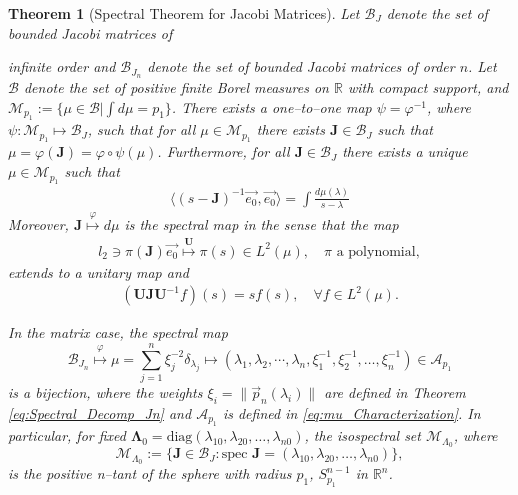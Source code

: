 \documentclass[english,12pt]{ttuthes}
\newtheorem{theorem}{Theorem}[chapter]
\begin{document}
\begin{theorem}[Spectral Theorem for Jacobi Matrices]
  \label{thm:Spectral_Theorem_J}
  Let $\mathcal{B}_J$ denote the set of bounded Jacobi matrices of

  infinite order and $\mathcal{B}_{J_n}$ denote the set of bounded Jacobi
  matrices of order $n$. Let $\mathscr{B}$ denote the set of positive
  finite Borel measures on $\mathbb{R}$ with compact support, and
  $\mathcal{M}_{p_1}:=\{\mu\in\mathscr{B}|\int d\mu=p_1\}$. There exists a one--to--one map
  $\psi=\varphi^{-1}$, where $\psi:\mathcal{M}_{p_1}\mapsto\mathcal{B}_J$, such that for all
  $\mu\in\mathcal{M}_{p_1}$ there exists $\mathbf{J}\in\mathcal{B}_J$ such that
  $\mu=\varphi(\mathbf{J})=\varphi\circ\psi(\mu)$. Furthermore, for all
  $\mathbf{J}\in\mathcal{B}_J$ there exists a unique $\mu\in\mathcal{M}_{p_1}$ 
  such that 
  \begin{align}
    \langle(s-\mathbf{J})^{-1}\vec{e_0},\vec{e_0}\rangle=\int\frac{d\mu(\lambda)}{s-\lambda}
  \end{align}
  Moreover, $\mathbf{J}\stackrel{\varphi}{\mapsto}d\mu$ is the spectral map in the
  sense that the map
  \begin{align}
    l_2\ni \pi(\mathbf{J})\vec{e_0}\stackrel{\mathbf{U}}{\mapsto} \pi(s)\in L^2(\mu), \quad
    \pi  \text{ a polynomial},
  \end{align}
%
  extends to a unitary map and
  \begin{align}
    (\mathbf{U}\mathbf{J}\mathbf{U}^{-1}f)(s)=sf(s),\quad
    \forall f\in L^2(\mu).
  \end{align}
                      
  In the matrix case, the spectral map
  $$
  \mathcal{B}_{J_n}\stackrel{\varphi}{\mapsto}
     \mu=\sum_{j=1}^n\xi_j^{-2}\delta_{\lambda_j}\mapsto(\lambda_1,\lambda_2,\cdots,\lambda_n,\xi_1^{-1},\xi_2^{-1},\ldots,\xi_n^{-1})\in\mathscr{A}_{p_1}     
  $$
  is a bijection, where the weights $\xi_i=\|\vec{p}_n(\lambda_i)\|$ are
  defined in Theorem \ref{eq:Spectral_Decomp_Jn} and $\mathscr{A}_{p_1}$ is
  defined in \eqref{eq:mu_Characterization}. In particular, for fixed
  $\mathbf{\Lambda}_0=\text{diag}(\lambda_{10},\lambda_{20},\ldots,\lambda_{n0})$, the isospectral
  set $\mathscr{M}_{\Lambda_0}$, where
  $$
  \mathscr{M}_{\Lambda_0}:=\{\mathbf{J}\in\mathcal{B}_J: 
                \text{spec }\mathbf{J}=(\lambda_{10},\lambda_{20},\ldots,\lambda_{n0})\},
  $$
  is the positive n--tant of the sphere with radius $p_1$,
  $S_{p_1}^{n-1}$ in $\mathbb{R}^n$.     
%  
\end{theorem}
\end{document}
